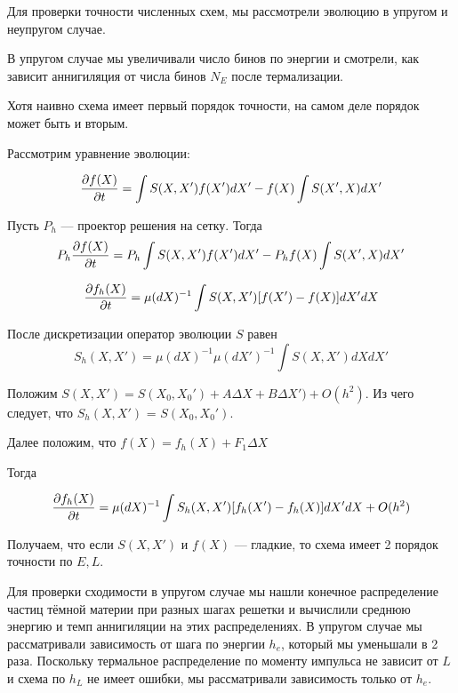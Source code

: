 
Для проверки точности численных схем, мы рассмотрели эволюцию в упругом и неупругом случае.

В упругом случае мы увеличивали число бинов по энергии и смотрели, как зависит аннигиляция от числа бинов $N_E$ после термализации. 

Хотя наивно схема имеет первый порядок точности, на самом деле порядок может быть и вторым.

Рассмотрим уравнение эволюции:

\begin{equation}
	\frac{\partial f(X)}{\partial t} = \int{S(X,X')f(X')dX'} - 	 f(X)\int{S(X',X)dX'} 
\end{equation}

Пусть $P_h$ --- проектор решения на сетку. Тогда
\begin{equation}
	P_h\frac{\partial f(X)}{\partial t} = P_h\int{S(X,X')f(X')dX'} - 	 P_h f(X)\int{S(X',X)dX'} 
\end{equation}

\begin{equation}
	\frac{\partial f_h(X)}{\partial t} = \mu(dX)^{-1} \int{S(X,X')[f(X')-f(X)]dX'dX}
\end{equation}

После дискретизации оператор эволюции $S$ равен 
\begin{equation}
	S_h(X,X') = \mu(dX)^{-1} \mu(dX')^{-1} \int{S(X,X')dXdX'}
\end{equation}

Положим $S(X,X') = S(X_0,X_0') + A\Delta X + B \Delta X') + O(h^2)$. Из чего следует, что $S_h(X,X')$ = $S(X_0,X_0')$. 

Далее положим, что $f(X) = f_h(X) + F_1\Delta X$

Тогда 

\begin{equation}
	\frac{\partial f_h(X)}{\partial t} = \mu(dX)^{-1} \int{S_h(X,X')[f_h(X')-f_h(X)]dX'dX} + O(h^2) 
\end{equation}

Получаем, что если $S(X,X')$ и $f(X)$ --- гладкие, то схема имеет 2 порядок точности по $E,L$.



Для проверки сходимости в упругом случае мы нашли конечное распределение частиц тёмной материи при разных шагах решетки и вычислили среднюю энергию и темп аннигиляции на этих распределениях. В упругом случае мы рассматривали зависимость от шага по энергии $h_e$, который мы уменьшали в 2 раза. Поскольку термальное распределение по моменту импульса не зависит от $L$ и схема по $h_L$ не имеет ошибки, мы рассматривали зависимость только от $h_e$. 



